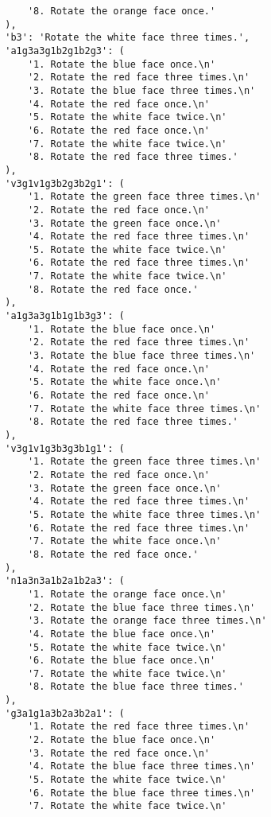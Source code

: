 \begin{lstlisting}
            '8. Rotate the orange face once.'
        ),
        'b3': 'Rotate the white face three times.',
        'a1g3a3g1b2g1b2g3': (
            '1. Rotate the blue face once.\n'
            '2. Rotate the red face three times.\n'
            '3. Rotate the blue face three times.\n'
            '4. Rotate the red face once.\n'
            '5. Rotate the white face twice.\n'
            '6. Rotate the red face once.\n'
            '7. Rotate the white face twice.\n'
            '8. Rotate the red face three times.'
        ),
        'v3g1v1g3b2g3b2g1': (
            '1. Rotate the green face three times.\n'
            '2. Rotate the red face once.\n'
            '3. Rotate the green face once.\n'
            '4. Rotate the red face three times.\n'
            '5. Rotate the white face twice.\n'
            '6. Rotate the red face three times.\n'
            '7. Rotate the white face twice.\n'
            '8. Rotate the red face once.'
        ),
        'a1g3a3g1b1g1b3g3': (
            '1. Rotate the blue face once.\n'
            '2. Rotate the red face three times.\n'
            '3. Rotate the blue face three times.\n'
            '4. Rotate the red face once.\n'
            '5. Rotate the white face once.\n'
            '6. Rotate the red face once.\n'
            '7. Rotate the white face three times.\n'
            '8. Rotate the red face three times.'
        ),
        'v3g1v1g3b3g3b1g1': (
            '1. Rotate the green face three times.\n'
            '2. Rotate the red face once.\n'
            '3. Rotate the green face once.\n'
            '4. Rotate the red face three times.\n'
            '5. Rotate the white face three times.\n'
            '6. Rotate the red face three times.\n'
            '7. Rotate the white face once.\n'
            '8. Rotate the red face once.'
        ),
        'n1a3n3a1b2a1b2a3': (
            '1. Rotate the orange face once.\n'
            '2. Rotate the blue face three times.\n'
            '3. Rotate the orange face three times.\n'
            '4. Rotate the blue face once.\n'
            '5. Rotate the white face twice.\n'
            '6. Rotate the blue face once.\n'
            '7. Rotate the white face twice.\n'
            '8. Rotate the blue face three times.'
        ),
        'g3a1g1a3b2a3b2a1': (
            '1. Rotate the red face three times.\n'
            '2. Rotate the blue face once.\n'
            '3. Rotate the red face once.\n'
            '4. Rotate the blue face three times.\n'
            '5. Rotate the white face twice.\n'
            '6. Rotate the blue face three times.\n'
            '7. Rotate the white face twice.\n'

\end{lstlisting}
